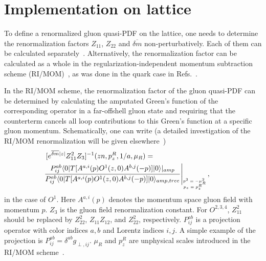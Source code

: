 \section{Implementation on lattice}\label{sec:lattice}

To define a renormalized gluon quasi-PDF on the lattice, one needs to determine the renormalization factors $Z_{11}$, $Z_{22}$ and ${\overline {\delta m}}$ non-perturbatively. Each of them can be calculated separately~\cite{Zhang:2017bzy}. Alternatively, the renormalization factor can be calculated as a whole in the regularization-independent momentum subtraction scheme (RI/MOM)~\cite{Martinelli:1994ty}, as was done in the quark case in Refs.~\cite{Stewart:2017tvs,Chen:2017mzz}.

In the RI/MOM scheme, the renormalization factor of the gluon quasi-PDF can be determined by calculating the amputated Green's function of the corresponding operator in a far-offshell gluon state and requiring that the counterterm cancels all loop contributions to this Green's function at a specific gluon momentum. Schematically, one can write (a detailed investigation of the RI/MOM renormalization will be given elsewhere~\cite{Todo:2018glu})
\begin{align}
&\hspace*{-1.5em}[e^{{\overline{\delta m}}|z|}Z_{11} ^2 Z_3]^{-1}(z n,p^R_z, 1/a, \mu_R)=\non\\
&\hspace*{-2em}\left.\frac{P_{ij}^{ab} \langle 0| T [A^{a,i} (p)  O^{1}(z,0)A^{b,j}(-p) ]|0\rangle|_{amp}}{P_{ij}^{ab} \langle 0|T [A^{a,i} (p)   O^{1}(z,0)A^{b,j} (-p)]|0\rangle_{amp,tree}}\right|_{\tiny\begin{matrix}p^2=-\mu_R^2 \\ \!\!\!\!p_z=p^R_z\end{matrix}},
\end{align}
in the case of $O^1$. Here $A^{a,i}(p)$ denotes the momentum space gluon field with momentum $p$. $Z_3$ is the gluon field renormalization constant. For $O^{2,3,4}$, $Z_{11} ^2$ should be replaced by $Z_{22} ^2$, $Z_{11}Z_{12}$, and $Z_{22} ^2$, respectively. $P_{ij}^{ab}$ is a projection operator with color indices $a,b$ and Lorentz indices $i, j$. A simple example of the projection is $P_{ij}^{ab}= \delta^{ab}g_{\perp,ij}$.
$\mu_R$ and $p_z^R$ are unphysical scales introduced in the RI/MOM scheme~\cite{Stewart:2017tvs,Chen:2017mzz}.

